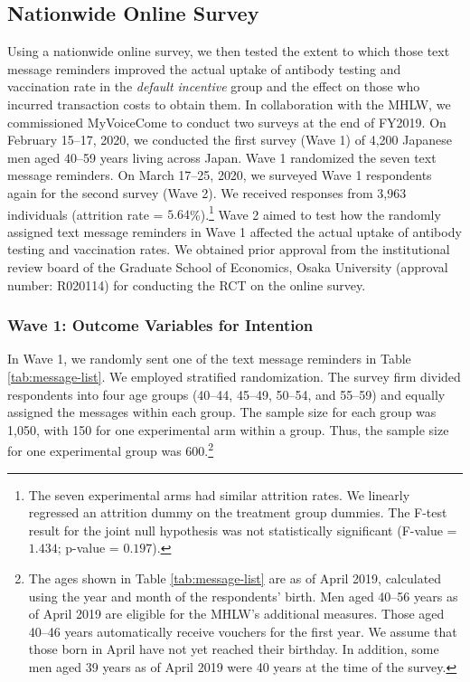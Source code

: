 \documentclass[
]{article}
\begin{document}
\hypertarget{survey}{%
\subsection{Nationwide Online Survey}\label{survey}}

Using a nationwide online survey, we then tested the extent to which those text message reminders improved the actual uptake of antibody testing and vaccination rate in the \emph{default incentive} group and the effect on those who incurred transaction costs to obtain them. In collaboration with the MHLW, we commissioned MyVoiceCome to conduct two surveys at the end of FY2019. On February 15--17, 2020, we conducted the first survey (Wave 1) of 4,200 Japanese men aged 40--59 years living across Japan. Wave 1 randomized the seven text message reminders. On March 17--25, 2020, we surveyed Wave 1 respondents again for the second survey (Wave 2). We received responses from 3,963 individuals (attrition rate = \(5.64\)\%).\footnote{The seven experimental arms had similar attrition rates. We linearly regressed an attrition dummy on the treatment group dummies. The F-test result for the joint null hypothesis was not statistically significant (F-value = \(1.434\); p-value = \(0.197\)).} Wave 2 aimed to test how the randomly assigned text message reminders in Wave 1 affected the actual uptake of antibody testing and vaccination rates. We obtained prior approval from the institutional review board of the Graduate School of Economics, Osaka University (approval number: R020114) for conducting the RCT on the online survey.

\hypertarget{wave1}{%
\subsubsection{Wave 1: Outcome Variables for Intention}\label{wave1}}

In Wave 1, we randomly sent one of the text message reminders in Table \ref{tab:message-list}. We employed stratified randomization. The survey firm divided respondents into four age groups (40--44, 45--49, 50--54, and 55--59) and equally assigned the messages within each group. The sample size for each group was 1,050, with 150 for one experimental arm within a group. Thus, the sample size for one experimental group was 600.\footnote{The ages shown in Table \ref{tab:message-list} are as of April 2019, calculated using the year and month of the respondents' birth. Men aged 40--56 years as of April 2019 are eligible for the MHLW's additional measures. Those aged 40--46 years automatically receive vouchers for the first year. We assume that those born in April have not yet reached their birthday. In addition, some men aged 39 years as of April 2019 were 40 years at the time of the survey.}
\end{document}
